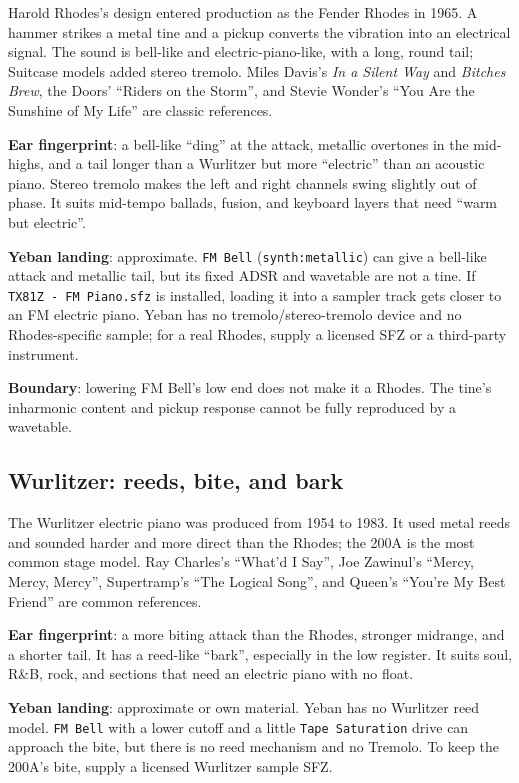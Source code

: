 Harold Rhodes's design entered production as the Fender Rhodes in 1965. A
hammer strikes a metal tine and a pickup converts the vibration into an
electrical signal. The sound is bell-like and electric-piano-like, with a
long, round tail; Suitcase models added stereo tremolo. Miles Davis's
\emph{In a Silent Way} and \emph{Bitches Brew}, the Doors' ``Riders on the
Storm'', and Stevie Wonder's ``You Are the Sunshine of My Life'' are classic
references.

\textbf{Ear fingerprint}: a bell-like ``ding'' at the attack, metallic
overtones in the mid-highs, and a tail longer than a Wurlitzer but more
``electric'' than an acoustic piano. Stereo tremolo makes the left and right
channels swing slightly out of phase. It suits mid-tempo ballads, fusion, and
keyboard layers that need ``warm but electric''.

\textbf{Yeban landing}: approximate. \texttt{FM Bell}
(\texttt{synth:metallic}) can give a bell-like attack and metallic tail, but
its fixed ADSR and wavetable are not a tine. If
\texttt{TX81Z - FM Piano.sfz} is installed, loading it into a sampler track
gets closer to an FM electric piano. Yeban has no tremolo/stereo-tremolo
device and no Rhodes-specific sample; for a real Rhodes, supply a licensed
SFZ or a third-party instrument.

\textbf{Boundary}: lowering FM Bell's low end does not make it a Rhodes. The
tine's inharmonic content and pickup response cannot be fully reproduced by a
wavetable.

\subsection{Wurlitzer: reeds, bite, and bark}
\label{sec:iconic-wurlitzer}

The Wurlitzer electric piano was produced from 1954 to 1983. It used metal
reeds and sounded harder and more direct than the Rhodes; the 200A is the most
common stage model. Ray Charles's ``What'd I Say'', Joe Zawinul's ``Mercy,
Mercy, Mercy'', Supertramp's ``The Logical Song'', and Queen's ``You're My
Best Friend'' are common references.

\textbf{Ear fingerprint}: a more biting attack than the Rhodes, stronger
midrange, and a shorter tail. It has a reed-like ``bark'', especially in the
low register. It suits soul, R\&B, rock, and sections that need an electric
piano with no float.

\textbf{Yeban landing}: approximate or own material. Yeban has no Wurlitzer
reed model. \texttt{FM Bell} with a lower cutoff and a little
\texttt{Tape Saturation} drive can approach the bite, but there is no reed
mechanism and no Tremolo. To keep the 200A's bite, supply a licensed
Wurlitzer sample SFZ.

